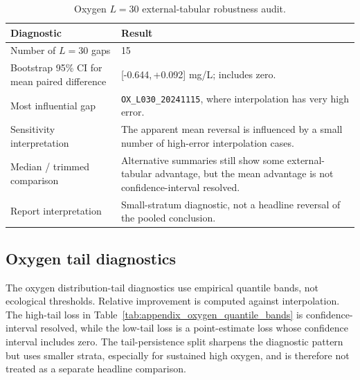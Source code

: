 \begin{table}[h]
  \centering
  \small
  \caption{Oxygen $L=30$ external-tabular robustness audit.}
  \label{tab:appendix_oxygen_l30_audit}
  \begin{tabularx}{\textwidth}{@{}l X@{}}
    \toprule
    Diagnostic & Result \\
    \midrule
    Number of $L=30$ gaps
    & 15 \\

    Bootstrap 95\% CI for mean paired difference
    & [-0.644,\,+0.092] mg/L; includes zero. \\

    Most influential gap
    & \texttt{OX\_L030\_20241115}, where interpolation has very high error. \\

    Sensitivity interpretation
    & The apparent mean reversal is influenced by a small number of high-error interpolation
      cases. \\

    Median / trimmed comparison
    & Alternative summaries still show some external-tabular advantage, but the mean advantage is
      not confidence-interval resolved. \\

    Report interpretation
    & Small-stratum diagnostic, not a headline reversal of the pooled conclusion. \\
    \bottomrule
  \end{tabularx}
\end{table}

\subsection{Oxygen tail diagnostics}
\label{app:oxygen_extended_diagnostics}

The oxygen distribution-tail diagnostics use empirical quantile bands, not ecological thresholds.
Relative improvement is computed against interpolation.
The high-tail loss in Table~\ref{tab:appendix_oxygen_quantile_bands} is confidence-interval
resolved, while the low-tail loss is a point-estimate loss whose confidence interval includes zero.
The tail-persistence split sharpens the diagnostic pattern but uses smaller strata, especially for
sustained high oxygen, and is therefore not treated as a separate headline comparison.

